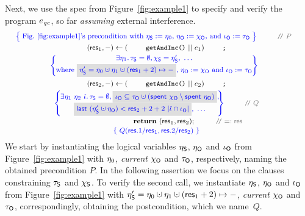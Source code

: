 Next, we use the spec from Figure~\ref{fig:example1} to specify and
verify the program $e_{\mathit{qc}}$, so far \emph{assuming} external
interference.
%
%
\[
\!\!\!
{\small{
\begin{array}{c}
\!\!\!\!\!
\spec{\!\!
  \begin{array}{c}
    \mbox{Fig.~\ref{fig:example1}'s precondition with $\gists := \gist_0$, $\gisto :=
      \histo$, and $\ikno := \tkno$}
  \end{array}
  \!\!}
  ~\comm{P}
  \\\\[-6pt]
  (\res_1, -) \Asgn (\esc{getAndInc()} ~||~ e_1) \esc{;}
  \\[3pt]
\!\!\!\!{{
\spec{\!\!\!\!
\begin{array}{c}
 \exists \gist_1\ldot \tkns = \emptyset\aand \hists = \gists',~\ldots
\\[2pt]
\mbox{where 
 $\gbm{\gists' = \gist_0 \hunion
\gist_1 \hunion (\res_1 + 2)\mapsto -}$, $\gisto := \histo$ and $\ikno :=
\tkno$} 
  \end{array}
\!\!\!\!}
}}
%
\\\\[-5pt]
(\res_2, -) \Asgn (\esc{getAndInc()} ~||~ e_2) \esc{;}      
\\[3pt]
\spec{\!\!\!\!
\begin{array}{c}
\exists \gist_1~\gist_2~\iknh \ldot     
%
\tkns = \emptyset \aand 
\gbm{\ikno \subseteq \tkno \hunion (\Tomb~\histo \setminus \Tomb~\gisto)},\\[1pt]
\gbm{\last~(\gists' \hunion \gisto) < \res_2 + 2 + 2~|\iknh \cap \ikno|},~\ldots 
\end{array}
\!\!\!\!\!}~\comm{Q}
\\\\[-7pt]
~~~~~~~~~~~~~~~~~~~~~~~~~~\kw{return}~(\res_1, \res_2); ~\comm{=: \res}
\\[2pt]
\spec{~Q(\res.1/\res_1, \res.2/\res_2)~} %
\end{array}
}} 
\]
%
We start by instantiating the logical variables $\eta_{\mathsf{S}}$, $\eta_{\mathsf{O}}$ and
$\iota_{\mathsf{O}}$ from Figure~\ref{fig:example1} with $\eta_0$, \emph{current}
$\chi_{\mathsf{O}}$ and $\tau_{\mathsf{O}}$, respectively, naming the obtained precondition
$P$.
%
In the following assertion we focus on the clauses constraining
$\tau_{\mathsf{S}}$ and $\chi_{\mathsf{S}}$. To verify the second call, we instantiate
$\eta_{\mathsf{S}}$, $\eta_{\mathsf{O}}$ and $\iota_{\mathsf{O}}$ from Figure~\ref{fig:example1} with
$\gists' = \gist_0 \hunion \gist_1 \hunion (\res_1 + 2)\mapsto -$,
\emph{current} $\chi_{\mathsf{O}}$ and $\tau_{\mathsf{O}}$, correspondingly, obtaining the
postcondition, which we name~$Q$.

